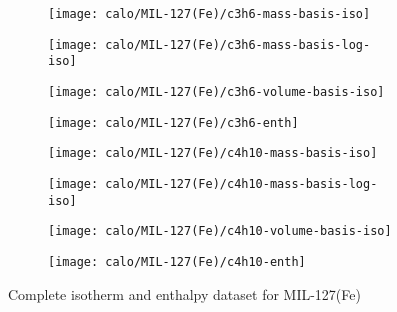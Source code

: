 \begin{figure}[H]
    \begin{subfigure}{0.25\textwidth}
        \texttt{[image: calo/MIL-127(Fe)/c3h6-mass-basis-iso]}%
        \label{appx:fgr:shaping:mil127c3h6mass}
    \end{subfigure}%
    \begin{subfigure}{0.25\textwidth}
        \texttt{[image: calo/MIL-127(Fe)/c3h6-mass-basis-log-iso]}%
        \label{appx:fgr:shaping:mil127c3h6masslog}
    \end{subfigure}%
    \begin{subfigure}{0.25\textwidth}
        \texttt{[image: calo/MIL-127(Fe)/c3h6-volume-basis-iso]}%
        \label{appx:fgr:shaping:mil127c3h6volume}
    \end{subfigure}%
    \begin{subfigure}{0.25\textwidth}
        \texttt{[image: calo/MIL-127(Fe)/c3h6-enth]}%
        \label{appx:fgr:shaping:mil127c3h6enth}
    \end{subfigure}%

    \begin{subfigure}{0.25\textwidth}
        \texttt{[image: calo/MIL-127(Fe)/c4h10-mass-basis-iso]}%
        \label{appx:fgr:shaping:mil127c4h10mass}
    \end{subfigure}%
    \begin{subfigure}{0.25\textwidth}
        \texttt{[image: calo/MIL-127(Fe)/c4h10-mass-basis-log-iso]}%
        \label{appx:fgr:shaping:mil127c4h10masslog}
    \end{subfigure}%
    \begin{subfigure}{0.25\textwidth}
        \texttt{[image: calo/MIL-127(Fe)/c4h10-volume-basis-iso]}%
        \label{appx:fgr:shaping:mil127c4h10volume}
    \end{subfigure}%
    \begin{subfigure}{0.25\textwidth}
        \texttt{[image: calo/MIL-127(Fe)/c4h10-enth]}%
        \label{appx:fgr:shaping:mil127c4h10enth}
    \end{subfigure}%

    \caption{Complete isotherm and enthalpy dataset for MIL-127(Fe)}%
    \label{appx:fgr:shaping:calomil127}
\end{figure}
